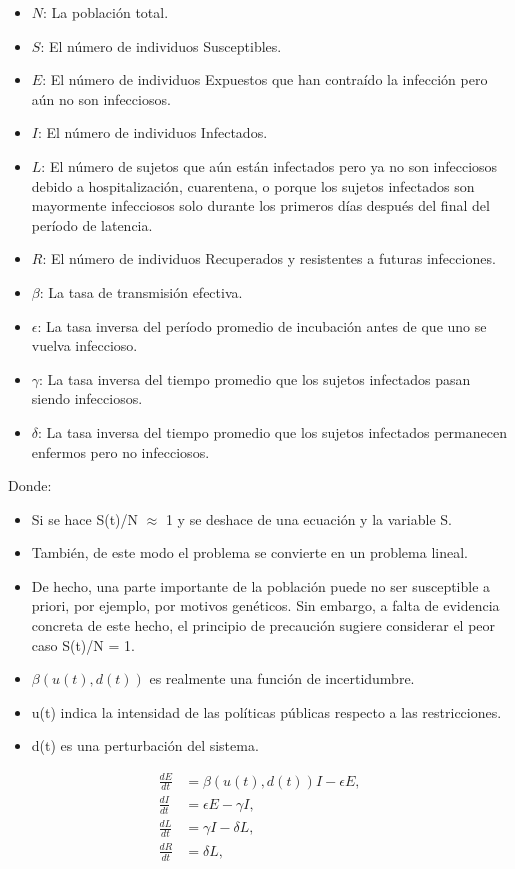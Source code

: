 \documentclass[journal]{IEEEtran}
\begin{document}
\begin{itemize}
    \item $N$: La población total.
    \item $S$: El número de individuos Susceptibles.
    \item $E$: El número de individuos Expuestos que han contraído la infección pero aún no son infecciosos.
    \item $I$: El número de individuos Infectados.
    \item $L$: El número de sujetos que aún están infectados pero ya no son infecciosos debido a hospitalización, cuarentena, o porque los sujetos infectados son mayormente infecciosos solo durante los primeros días después del final del período de latencia.
    \item $R$: El número de individuos Recuperados y resistentes a futuras infecciones.
    \item $\beta$: La tasa de transmisión efectiva.
    \item $\epsilon$: La tasa inversa del período promedio de incubación antes de que uno se vuelva infeccioso.
    \item $\gamma$: La tasa inversa del tiempo promedio que los sujetos infectados pasan siendo infecciosos.
    \item $\delta$: La tasa inversa del tiempo promedio que los sujetos infectados permanecen enfermos pero no infecciosos.
\end{itemize}


Donde:
\begin{itemize}
    \item Si se hace S(t)/N $\approx$ 1 y se deshace de una ecuación y la variable S.
    \item También, de este modo el problema se convierte en un problema lineal.
    \item De hecho, una parte importante de la población puede no ser susceptible a priori, por ejemplo, por motivos genéticos. Sin embargo, a falta de evidencia concreta de este hecho, el principio de precaución sugiere considerar el peor caso S(t)/N = 1.
    \item  $\beta(u(t), d(t))$ es realmente una función de incertidumbre.
    \item u(t) indica la intensidad de las políticas públicas respecto a las restricciones.
    \item d(t) es una perturbación del sistema.
\end{itemize}

\begin{align}
    \frac{dE}{dt} &= \beta(u(t), d(t))I - \epsilon E, \label{eq:Et} \\[10pt]
    \frac{dI}{dt} &= \epsilon E - \gamma I, \label{eq:It} \\[10pt]
    \frac{dL}{dt} &= \gamma I - \delta L, \label{eq:Lt} \\[10pt]
    \frac{dR}{dt} &= \delta L, \label{eq:Tt}
\end{align}
\end{document}
